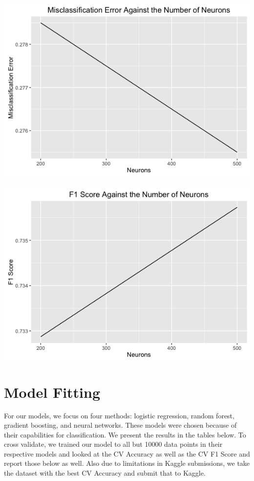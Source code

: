 \documentclass{article}
\begin{document}
\centerline{\includegraphics[scale=.29]{diagrams/8nn.png} ~~~~~~~~~~~~~~~ \includegraphics[scale=.29]{diagrams/9nn.png}}

\section{Model Fitting}
For our models, we focus on four methods: logistic regression, random forest, gradient boosting, and neural networks. These models were chosen because of their capabilities for classification. We present the results in the tables below. To cross validate, we trained our model to all but 10000 data points in their respective models and looked at the CV Accuracy as well as the CV F1 Score and report those below as well. Also due to limitations in Kaggle submissions, we take the dataset with the best CV Accuracy and submit that to Kaggle.
\end{document}
